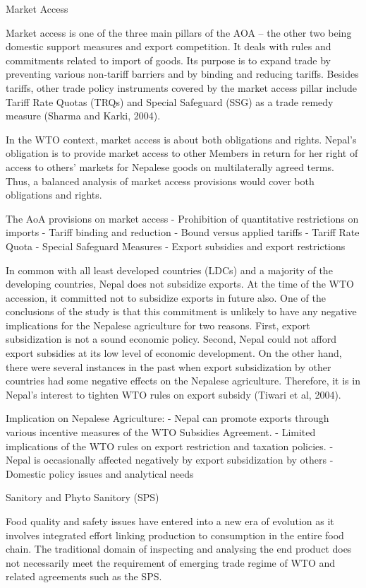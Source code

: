 \documentclass[]{book}
\begin{document}
Market Access

Market access is one of the three main pillars of the AOA -- the other two being domestic support measures and export competition. It deals with rules and commitments related to import of goods. Its purpose is to expand trade by preventing various non-tariff barriers and by binding and reducing tariffs. Besides tariffs, other trade policy instruments covered by the market access pillar include Tariff Rate Quotas (TRQs) and Special Safeguard (SSG) as a trade remedy measure (Sharma and Karki, 2004).

In the WTO context, market access is about both obligations and rights. Nepal's obligation is to provide market access to other Members in return for her right of access to others' markets for Nepalese goods on multilaterally agreed terms. Thus, a balanced analysis of market access provisions would cover both obligations and rights.

The AoA provisions on market access
- Prohibition of quantitative restrictions on imports
- Tariff binding and reduction
- Bound versus applied tariffs
- Tariff Rate Quota
- Special Safeguard Measures
- Export subsidies and export restrictions

In common with all least developed countries (LDCs) and a majority of the developing countries, Nepal does not subsidize exports. At the time of the WTO accession, it committed not to subsidize exports in future also. One of the conclusions of the study is that this commitment is unlikely to have any negative implications for the Nepalese agriculture for two reasons. First, export subsidization is not a sound economic policy. Second, Nepal could not afford export subsidies at its low level of economic development. On the other hand, there were several instances in the past when export subsidization by other countries had some negative effects on the Nepalese agriculture. Therefore, it is in Nepal's interest to tighten WTO rules on export subsidy (Tiwari et al, 2004).

Implication on Nepalese Agriculture:
- Nepal can promote exports through various incentive measures of the WTO Subsidies Agreement.
- Limited implications of the WTO rules on export restriction and taxation policies.
- Nepal is occasionally affected negatively by export subsidization by others
- Domestic policy issues and analytical needs

Sanitory and Phyto Sanitory (SPS)

Food quality and safety issues have entered into a new era of evolution as it involves integrated effort linking production to consumption in the entire food chain. The traditional domain of inspecting and analysing the end product does not necessarily meet the requirement of emerging trade regime of WTO and related agreements such as the SPS.
\end{document}
